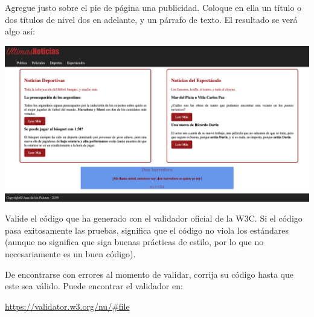 \begin{exercise}
Agregue justo sobre el pie de página una publicidad. Coloque en ella
un título o dos títulos de nivel dos en adelante, y un párrafo de
texto. El resultado se verá algo así:

\includegraphics[scale=0.3]{anexos/1_lenguajes_marcado/2_html/imagenes/diario_6.png}
\end{exercise}

\begin{exercise}
  Valide el código que ha generado con el validador oficial de la W3C.
  Si el código pasa exitosamente las pruebas, significa que el código
  no viola los estándares (aunque no significa que siga buenas prácticas
  de estilo, por lo que no necesariamente es un buen código).

  De encontrarse con errores al momento de validar, corrija su código
  hasta que este sea válido. Puede encontrar el validador en:

  \href{https://validator.w3.org/nu/\#file}{https://validator.w3.org/nu/\#file}
\end{exercise}


